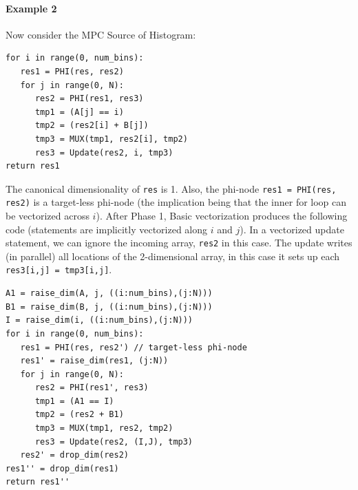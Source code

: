 \documentclass[sigconf, screen, natbib=false, dvipsnames, table]{acmart}
\theoremstyle{definition}
\begin{document}

\paragraph{Example 2} Now consider the MPC Source of Histogram:

{\small
\begin{verbatim}
for i in range(0, num_bins):
   res1 = PHI(res, res2)
   for j in range(0, N):
      res2 = PHI(res1, res3)
      tmp1 = (A[j] == i)
      tmp2 = (res2[i] + B[j])
      tmp3 = MUX(tmp1, res2[i], tmp2)
      res3 = Update(res2, i, tmp3)     
return res1
\end{verbatim}
}

The canonical dimensionality of \texttt{res} is 1. Also, the phi-node \texttt{res1 = PHI(res, res2)} is a target-less phi-node (the implication being that the inner for loop can be vectorized across $i$). After Phase 1, Basic vectorization produces the following code (statements are implicitly vectorized along $i$ and $j$). In a vectorized update statement, we can ignore the incoming array, \texttt{res2} in this case. The update writes (in parallel) all locations of the 2-dimensional array, in this case it sets up each \texttt{res3[i,j] = tmp3[i,j]}.

{\small
\begin{verbatim}
A1 = raise_dim(A, j, ((i:num_bins),(j:N)))
B1 = raise_dim(B, j, ((i:num_bins),(j:N)))
I = raise_dim(i, ((i:num_bins),(j:N)))
for i in range(0, num_bins):
   res1 = PHI(res, res2') // target-less phi-node
   res1' = raise_dim(res1, (j:N))
   for j in range(0, N):
      res2 = PHI(res1', res3)
      tmp1 = (A1 == I)
      tmp2 = (res2 + B1)
      tmp3 = MUX(tmp1, res2, tmp2)
      res3 = Update(res2, (I,J), tmp3) 
   res2' = drop_dim(res2)    
res1'' = drop_dim(res1)
return res1''
\end{verbatim}
}
\end{document}
